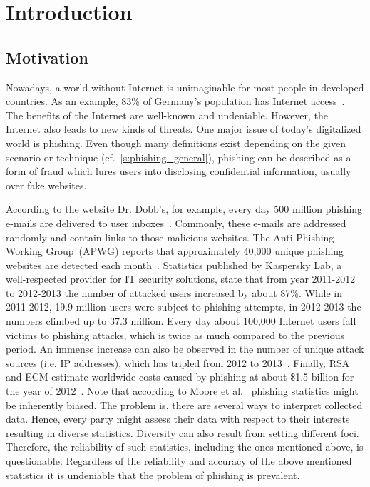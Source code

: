 \section{Introduction}
\label{s:introduction}

\subsection{Motivation}
Nowadays, a world without Internet is unimaginable for most people in developed countries.
As an example, 83\% of Germany's population has Internet access~\cite{globalfinance2012internetusage}. 
The benefits of the Internet are well-known and undeniable.
However, the Internet also leads to new kinds of threats.
One major issue of today's digitalized world is phishing. 
Even though many definitions exist depending on the given scenario or technique (cf.~\autoref{s:phishing_general}), phishing can be described as a form of fraud which lures users into disclosing confidential information, usually over fake websites.

According to the website Dr. Dobb's, for example, every day 500 million phishing e-mails are delivered to user inboxes~\cite{drdobb2012email}.
Commonly, these e-mails are addressed randomly and contain links to those malicious websites.
The Anti-Phishing Working Group~(APWG) reports that approximately 40,000 unique phishing websites are detected each month~\cite{antiphishingtrendreport2013}. Statistics published by Kaspersky Lab, a well-respected provider for IT security solutions, state that from year 2011-2012 to 2012-2013 the number of attacked users increased by about 87\%. 
While in 2011-2012, 19.9 million users were subject to phishing attempts, in 2012-2013 the numbers climbed up to 37.3 million. 
 Every day about 100,000 Internet users fall victims to phishing attacks, which is twice as much compared to the previous period. An immense increase can also be observed in the number of unique attack sources (i.e. IP addresses), which has tripled from 2012 to 2013~\cite{kasperskyreport2013}. 
Finally, RSA and ECM estimate worldwide costs caused by phishing at about \$1.5 billion for the year of 2012~\cite{rsa2013}. Note that according to Moore et al.~\cite{moore2010hard} phishing statistics might be inherently biased. 
The problem is, there are several ways to interpret collected data. 
Hence, every party might assess their data with respect to their interests resulting in diverse statistics. 
Diversity can also result from setting different foci.
Therefore, the reliability of such statistics, including the ones mentioned above, is questionable. 
Regardless of the reliability and accuracy of the above mentioned statistics it is undeniable that the problem of phishing is prevalent.

